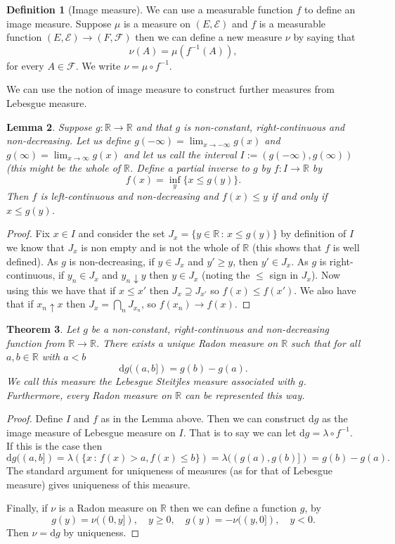 \documentclass[11pt]{article}
\newtheorem{thm}{Theorem}[section]
\newtheorem{lem}[thm]{Lemma}
\theoremstyle{definition}
\newtheorem{dfn}[thm]{Definition}
\theoremstyle{remark}
\begin{document}
\begin{dfn}[Image measure]
We can use a measurable function $f$ to define an image measure. Suppose $\mu$ is a measure on $(E, \mathcal{E})$ and $f$ is a measurable function $(E, \mathcal{E}) \rightarrow (F, \mathcal{F})$ then we can define a new measure $\nu$ by saying that
\[ \nu(A) = \mu(f^{-1}(A)),  \] for every $A \in \mathcal{F}$. We write $\nu = \mu \circ f^{-1}$.
\end{dfn}

We can use the notion of image measure to construct further measures from Lebesgue measure.
\begin{lem}
Suppose $g: \mathbb{R} \rightarrow \mathbb{R}$ and that $g$ is non-constant, right-continuous and non-decreasing. Let us define $g(-\infty) = \lim_{x \rightarrow -\infty} g(x)$ and $g(\infty) = \lim_{x \rightarrow \infty} g(x)$ and let us call the interval $I:= (g(-\infty),g(\infty))$ (this might be the whole of $\mathbb{R}$. Define a partial inverse to $g$ by $f: I \rightarrow \mathbb{R}$ by
\[ f(x) = \inf_y \{ x \leq g(y)\}. \] Then $f$ is left-continuous and non-decreasing and $f(x) \leq y$ if and only if $x \leq g(y)$. 
\end{lem}
\begin{proof}
Fix $x \in I$ and consider the set $J_x = \{ y \in \mathbb{R}\,:\, x \leq g(y)\}$ by definition of $I$ we know that $J_x$ is non empty and is not the whole of $\mathbb{R}$ (this shows that $f$ is well defined). As $g$ is non-decreasing, if $y \in J_x$ and $y' \geq y$, then $y' \in J_x$. As $g$ is right-continuous, if $y_n \in J_x$ and $y_n \downarrow y$ then $y \in J_x$ (noting the $\leq$ sign in $J_x$). Now using this we have that if $x \leq x'$ then $J_x \supseteq J_{x'}$ so $f(x) \leq f(x')$. We also have that if $x_n \uparrow x$ then $J_x = \bigcap_n J_{x_n}$, so $f(x_n) \rightarrow f(x)$. 
\end{proof}

\begin{thm} Let $g$ be a non-constant, right-continuous and non-decreasing function from $\mathbb{R} \rightarrow \mathbb{R}$. There exists a unique Radon measure on $\mathbb{R}$ such that for all $a,b \in \mathbb{R}$ with $a < b$ 
\[ \mathrm{d}g((a,b]) = g(b) - g(a). \] We call this measure the \emph{Lebesgue Steitjles} measure associated with $g$. Furthermore, every Radon measure on $\mathbb{R}$ can be represented this way.
\end{thm}
\begin{proof}
Define $I$ and $f$ as in the Lemma above. Then we can construct $\mathrm{d}g$ as the image measure of Lebesgue measure on $I$. That is to say we can let $\mathrm{d}g = \lambda \circ f^{-1}$. If this is the case then
\[ \mathrm{d}g ((a,b]) = \lambda \left(\{ x \, :\, f(x) > a, f(x) \leq b \} \right) = \lambda ((g(a), g(b)]) = g(b) - g(a). \] The standard argument for uniqueness of measures (as for that of Lebesgue measure) gives uniqueness of this measure. 

Finally, if $\nu$ is a Radon measure on $\mathbb{R}$ then we can define a function $g$, by 
\[ g(y) = \nu((0,y]), \quad y \geq 0, \quad g(y) = -\nu((y,0]), \quad y<0. \] Then $\nu = \mathrm{d}g$ by uniqueness.
\end{proof}
\end{document}
